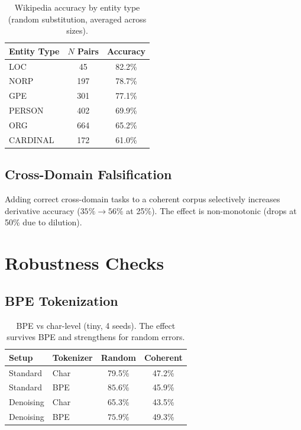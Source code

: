 \documentclass{article}
\begin{document}
\begin{table}[h]
\centering
\small
\begin{tabular}{lcc}
\toprule
Entity Type & $N$ Pairs & Accuracy \\
\midrule
LOC      & 45  & 82.2\% \\
NORP     & 197 & 78.7\% \\
GPE      & 301 & 77.1\% \\
PERSON   & 402 & 69.9\% \\
ORG      & 664 & 65.2\% \\
CARDINAL & 172 & 61.0\% \\
\bottomrule
\end{tabular}
\caption{Wikipedia accuracy by entity type (random substitution, averaged across sizes).}
\label{tab:wiki_entity}
\end{table}

\subsection{Cross-Domain Falsification}

Adding correct cross-domain tasks to a coherent corpus selectively increases derivative accuracy ($35\% \to 56\%$ at 25\%). The effect is non-monotonic (drops at 50\% due to dilution).

\section{Robustness Checks}
\label{app:robustness}

\subsection{BPE Tokenization}

\begin{table}[h]
\centering
\small
\begin{tabular}{llcc}
\toprule
Setup & Tokenizer & Random & Coherent \\
\midrule
Standard  & Char & 79.5\% & 47.2\% \\
Standard  & BPE  & $\mathbf{85.6\%}$ & 45.9\% \\
Denoising & Char & 65.3\% & 43.5\% \\
Denoising & BPE  & $\mathbf{75.9\%}$ & 49.3\% \\
\bottomrule
\end{tabular}
\caption{BPE vs char-level (tiny, 4 seeds). The effect survives BPE and strengthens for random errors.}
\label{tab:bpe}
\end{table}
\end{document}
